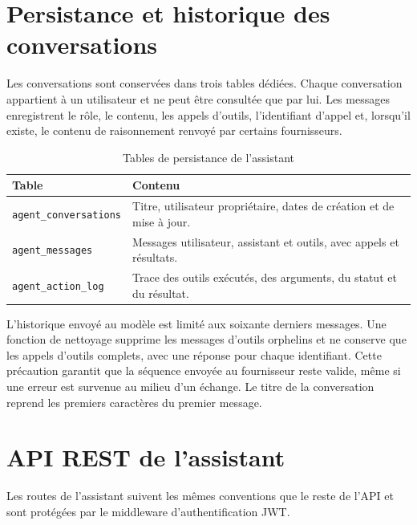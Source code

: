 \documentclass[12pt,a4paper,oneside]{report}
\newcommand{\code}[1]{\texttt{#1}}
\begin{document}
\section{Persistance et historique des conversations}
Les conversations sont conservées dans trois tables dédiées. Chaque conversation appartient à un utilisateur et ne peut être consultée que par lui. Les messages enregistrent le rôle, le contenu, les appels d'outils, l'identifiant d'appel et, lorsqu'il existe, le contenu de raisonnement renvoyé par certains fournisseurs.

\begin{table}[H]\centering
\caption{Tables de persistance de l'assistant}
\begin{tabularx}{\textwidth}{p{5.2cm}Y}
\toprule \textbf{Table} & \textbf{Contenu}\\ \midrule
\code{\small agent\_conversations} & Titre, utilisateur propriétaire, dates de création et de mise à jour.\\
\code{\small agent\_messages} & Messages utilisateur, assistant et outils, avec appels et résultats.\\
\code{\small agent\_action\_log} & Trace des outils exécutés, des arguments, du statut et du résultat.\\
\bottomrule
\end{tabularx}
\end{table}

L'historique envoyé au modèle est limité aux soixante derniers messages. Une fonction de nettoyage supprime les messages d'outils orphelins et ne conserve que les appels d'outils complets, avec une réponse pour chaque identifiant. Cette précaution garantit que la séquence envoyée au fournisseur reste valide, même si une erreur est survenue au milieu d'un échange. Le titre de la conversation reprend les premiers caractères du premier message.

\section{API REST de l'assistant}
Les routes de l'assistant suivent les mêmes conventions que le reste de l'API et sont protégées par le middleware d'authentification JWT.
\end{document}

